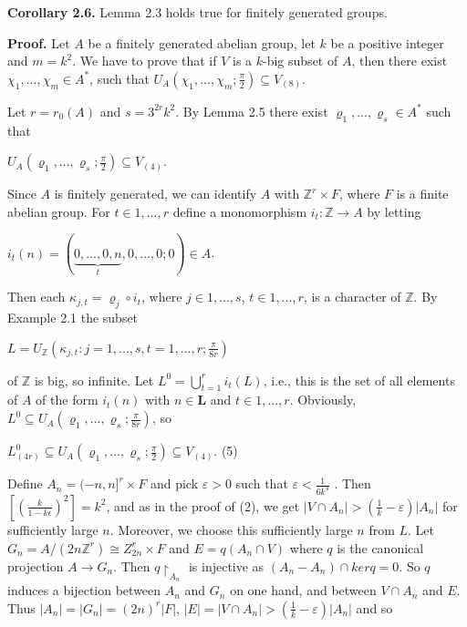 \documentclass[12pt]{article}
\begin{document}
    \textbf{Corollary 2.6.} Lemma 2.3 holds true for finitely generated groups.


    \textbf{Proof.} Let $A$ be a finitely generated abelian group, let $k$ be a positive integer and $m = k^2$. We have to prove that if $V$ is a
    $k$-big subset of $A$, then there exist $\chi_1,...,\chi_m \in A^*$, such that $U_A(\chi_1,...,\chi_m; \frac{\pi}{2} ) \subseteq V_{(8)}$.


    Let $r = r_0 (A)$ and $s = 3^{2r}k^2$. By Lemma 2.5 there exist $\varrho_1,...,\varrho_s \in A^*$ such that


        $U_A (\varrho_1,...,\varrho_s; \frac{\pi}{2}) \subseteq V_{(4)}$.


    Since $A$ is finitely generated, we can identify $A$ with $\mathbb{Z}^r \times F$, where $F$ is a finite abelian group. For $t \in {1,...,r}$ define a
    monomorphism $i_t : \mathbb{Z} \to A$ by letting


    $i_t (n) = (\underbrace{0,..., 0,n}_{t}, 0,..., 0; 0) \in A$.
    

    Then each $κ_{j,t} = \varrho_j \circ i_t$, where $j \in {1,..., s}$, $t \in {1,...,r}$, is a character of $\mathbb{Z}$. By Example 2.1 the subset


        $L = U_{\mathbb{Z}} ({κ_{j,t}: j = 1,..., s, t = 1,...,r}; \frac{\pi}{8r})$

    
    of $\mathbb{Z}$ is big, so infinite. Let $L^0 = \bigcup^{r}_{t=1} i_t (L)$, i.e., this is the set of all elements of $A$ of the form $i_t (n)$ with $n \in \mathbf{L}$ and
    $t \in {1,...,r}$. Obviously, $L^0 \subseteq U_A(\varrho_1,...,\varrho_s; \frac{\pi}{8r} )$, so


        $L^0_{(4r)} \subseteq U_A(\varrho_1,...,\varrho_s; \frac{\pi}{2}) \subseteq V_{(4)}$. (5)


    Define $A_n = (-n,n]^r \times F$ and pick $\varepsilon > 0$ such that $\varepsilon < \frac{1}{6k^4}$ . Then $[( \frac{k}{1-k\epsilon} )^2] = k^2$, and as in the proof of (2), we get
    $|V \cap A_n| > ( \frac{1}{k} - \varepsilon)|A_n|$ for sufficiently large $n$. Moreover, we choose this sufficiently large $n$ from $L$. Let
    $G_n = A/(2n \mathbb{Z}^r) \cong Z^r_{2n} \times F$ and $E = q(A_n \cap V)$ where $q$ is the canonical projection $A \to G_n$. Then $q\upharpoonright_{A_n}$ is injective as $(A_n - A_n) \cap ker q = 0$.
    So $q$ induces a bijection between $A_n$ and $G_n$ on one hand, and between $V \cap A_n$ and $E$. Thus $|A_n|=|G_n| = (2n)^r|F|$, $|E| =|V \cap A_n| > ( \frac{1}{k} - \varepsilon)|A_n|$ and so
\end{document}
